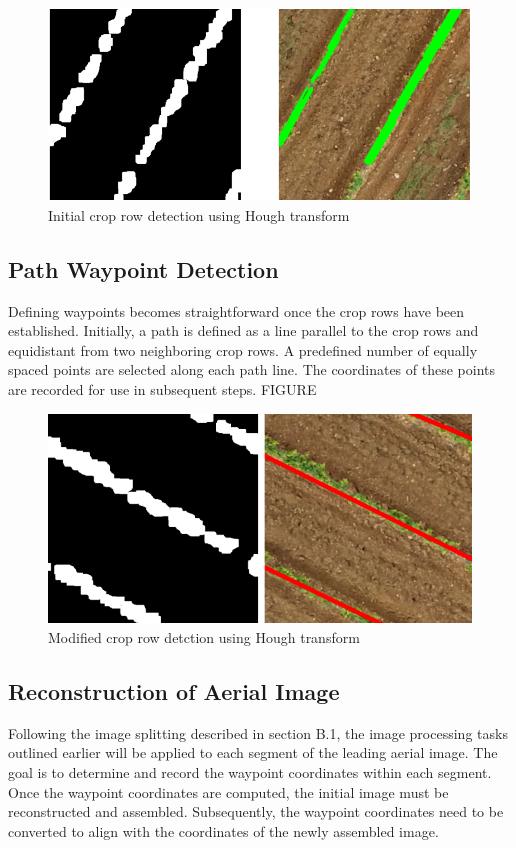 \documentclass[conference]{IEEEtran}
\begin{document}
\begin{figure}[htbp]
\includegraphics[width=\linewidth]{Hough initial2.png}
\caption{Initial crop row detection using Hough transform}
\label{fig3}
\end{figure}

\subsection{Path Waypoint Detection}
Defining waypoints becomes straightforward once the crop rows have been established. Initially, a path is defined as a line parallel to the crop rows and equidistant from two neighboring crop rows. A predefined number of equally spaced points are selected along each path line. The coordinates of these points are recorded for use in subsequent steps. FIGURE

\begin{figure}[htbp]
\includegraphics[width=\linewidth]{Hough Revised2.png}
\caption{Modified crop row detction using Hough transform}
\label{fig4}
\end{figure}


\subsection{Reconstruction of Aerial Image}
Following the image splitting described in section B.1, the image processing tasks outlined earlier will be applied to each segment of the leading aerial image. The goal is to determine and record the waypoint coordinates within each segment. Once the waypoint coordinates are computed, the initial image must be reconstructed and assembled. Subsequently, the waypoint coordinates need to be converted to align with the coordinates of the newly assembled image.
\end{document}

